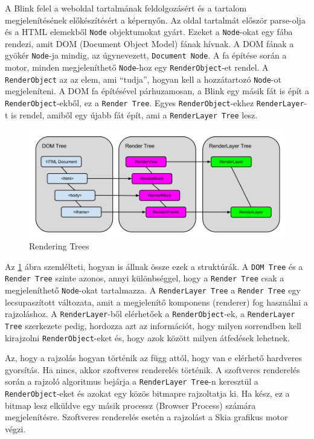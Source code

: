 \documentclass[12pt]{report}
\begin{document}
A Blink felel a weboldal tartalmának feldolgozásért és a tartalom megjelenítésének
előkészítésért a képernyőn. Az oldal tartalmát először parse-olja és a HTML elemekből
\texttt{Node} objektumokat gyárt.
Ezeket a \texttt{Node}-okat egy fába rendezi, amit DOM (Document Object Model) fának hívnak.
A DOM fának a gyökér \texttt{Node}-ja mindig, az úgynevezett, \texttt{Document Node}.
A fa építése során a motor, minden megjeleníthető \texttt{Node}-hoz egy
\texttt{RenderObject}-et rendel. A \texttt{RenderObject} az az elem, ami ``tudja'',
hogyan kell a hozzátartozó \texttt{Node}-ot megjeleníteni.
A DOM fa építésével párhuzamosan, a Blink egy másik fát is épít a
\texttt{RenderObject}-ekből, ez a \texttt{Render Tree}. Egyes
\texttt{RenderObject}-ekhez \texttt{RenderLayer}-t is rendel, amiből egy újabb fát épít,
ami a \texttt{RenderLayer Tree} lesz.

\begin{figure}[h]
    \centering
    \includegraphics[scale=0.46]{rendering-trees}
    \caption{
        \label{fig:rendering-trees}
        Rendering Trees \cite{bib:chromium-oopifs}
    }
\end{figure}

\noindent
Az \ref{fig:rendering-trees} ábra szemlélteti, hogyan is állnak össze ezek a struktúrák.
A \texttt{DOM Tree} és a \texttt{Render Tree} szinte azonos, annyi különbséggel, hogy
a \texttt{Render Tree} csak a megjeleníthető \texttt{Node}-okat tartalmazza.
A \texttt{RenderLayer Tree} a \texttt{Render Tree} egy lecsupaszított változata, amit a
megjelenítő komponens (renderer) fog használni a rajzoláshoz.
A \texttt{RenderLayer}-ből elérhetőek a \texttt{RenderObject}-ek, a \texttt{RenderLayer Tree}
szerkezete pedig, hordozza azt az információt, hogy milyen sorrendben kell kirajzolni
\texttt{RenderObject}-eket és, hogy azok között milyen átfedések lehetnek.

Az, hogy a rajzolás hogyan történik az függ attól, hogy van e elérhető hardveres gyorsítás.
Ha nincs, akkor szoftveres renderelés történik. A szoftveres renderelés során a rajzoló
algoritmus bejárja a \texttt{RenderLayer Tree}-n keresztül a \texttt{RenderObject}-eket és
azokat egy közös bitmapre rajzoltatja ki. Ha kész, ez a bitmap lesz elküldve egy másik
processz (Browser Process) számára megjelenítésre. Szoftveres renderelés esetén a rajzolást
a Skia grafikus motor végzi.
\end{document}
